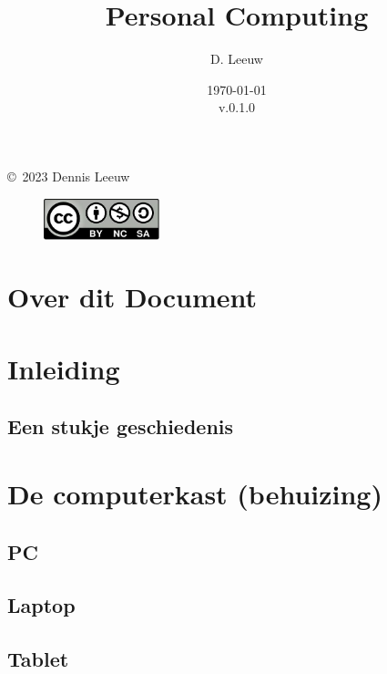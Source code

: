 \documentclass[a4paper,12pt,twoside,openright,titlepage]{book}
\author{D. Leeuw}
\title{Personal Computing}
\date{\today\\v.0.1.0}
\begin{document}

\maketitle

\copyright\ 2023 Dennis Leeuw\\

\begin{figure}
\includegraphics[width=0.3\textwidth]{CC-BY-SA-NC.png}
\end{figure}

\bigskip




\frontmatter
\chapter{Over dit Document}



\tableofcontents


\mainmatter
\chapter{Inleiding}

\section{Een stukje geschiedenis}


\chapter{De computerkast (behuizing)}
\section{PC}
\section{Laptop}
\section{Tablet}
\end{document}
